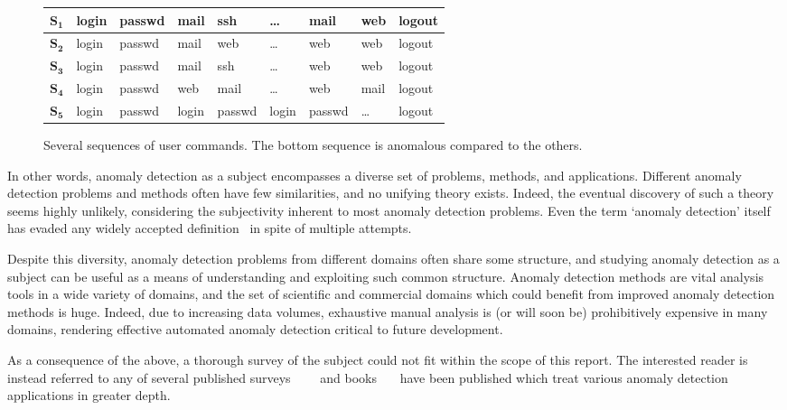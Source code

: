 \begin{figure}[htb]
    \centering
    \begin{tabular}{| l | l l l l l l l l |}
        \hline
        $\mathbf{S_1}$ & login & passwd & mail & ssh & \dots & mail & web & logout \\ \hline
        $\mathbf{S_2}$ & login & passwd & mail & web & \dots & web & web & logout \\ \hline
        $\mathbf{S_3}$ & login & passwd & mail & ssh & \dots & web & web & logout \\ \hline
        $\mathbf{S_4}$ & login & passwd & web & mail & \dots & web & mail & logout \\ \hline
        $\mathbf{S_5}$ & login & passwd & login & passwd & login & passwd & \dots & logout \\\hline
    \end{tabular}
    \caption{Several sequences of user commands. The bottom sequence is anomalous compared to the others.}
\label{fig:example1}
\end{figure}

In other words, anomaly detection as a subject encompasses a diverse set of problems, methods, and applications. Different anomaly detection problems and methods often have few similarities, and no unifying theory exists. Indeed, the eventual discovery of such a theory seems highly unlikely, considering the subjectivity inherent to most anomaly detection problems. Even the term `anomaly detection' itself has evaded any widely accepted definition~\cite{hodge} in spite of multiple attempts.

Despite this diversity, anomaly detection problems from different domains often share some structure, and studying anomaly detection as a subject can be useful as a means of understanding and exploiting such common structure. Anomaly detection methods are vital analysis tools in a wide variety of domains, and the set of scientific and commercial domains which could benefit from improved anomaly detection methods is huge. Indeed, due to increasing data volumes, exhaustive manual analysis is (or will soon be) prohibitively expensive in many domains, rendering effective automated anomaly detection critical to future development.

As a consequence of the above, a thorough survey of the subject could not fit within the scope of this report. The interested reader is instead referred to any of several published surveys~\cite{hodge}~\cite{bakar}~\cite{chandola}~\cite{agyemang} and books~\cite{barnett}~\cite{hawkins}~\cite{leroy} have been published which treat various anomaly detection applications in greater depth.

